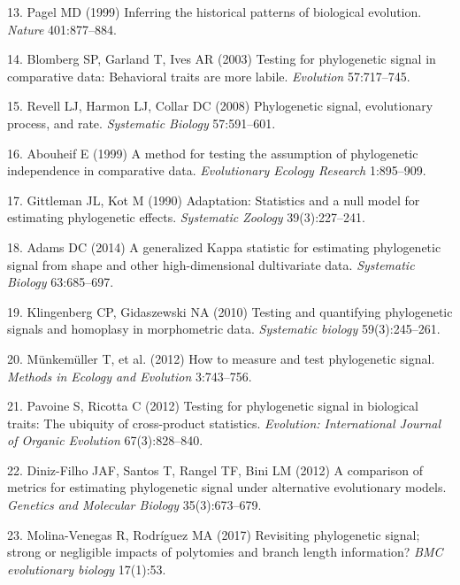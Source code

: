 \documentclass[9pt,twocolumn,twoside,lineno]{pnas-new}
\begin{document}
\leavevmode\hypertarget{ref-Pagel1999}{}%
13. Pagel MD (1999) Inferring the historical patterns of biological
evolution. \emph{Nature} 401:877--884.

\leavevmode\hypertarget{ref-Blomberg_et_al2003}{}%
14. Blomberg SP, Garland T, Ives AR (2003) Testing for phylogenetic
signal in comparative data: Behavioral traits are more labile.
\emph{Evolution} 57:717--745.

\leavevmode\hypertarget{ref-Revell_et_al2008}{}%
15. Revell LJ, Harmon LJ, Collar DC (2008) Phylogenetic signal,
evolutionary process, and rate. \emph{Systematic Biology} 57:591--601.

\leavevmode\hypertarget{ref-Abouheif1999}{}%
16. Abouheif E (1999) A method for testing the assumption of
phylogenetic independence in comparative data. \emph{Evolutionary
Ecology Research} 1:895--909.

\leavevmode\hypertarget{ref-Gittleman1990}{}%
17. Gittleman JL, Kot M (1990) Adaptation: Statistics and a null model
for estimating phylogenetic effects. \emph{Systematic Zoology}
39(3):227--241.

\leavevmode\hypertarget{ref-Adams2014a}{}%
18. Adams DC (2014) A generalized Kappa statistic for estimating
phylogenetic signal from shape and other high-dimensional dultivariate
data. \emph{Systematic Biology} 63:685--697.

\leavevmode\hypertarget{ref-Klingenberg2010}{}%
19. Klingenberg CP, Gidaszewski NA (2010) Testing and quantifying
phylogenetic signals and homoplasy in morphometric data.
\emph{Systematic biology} 59(3):245--261.

\leavevmode\hypertarget{ref-Munkemuller_et_al2012}{}%
20. Münkemüller T, et al. (2012) How to measure and test phylogenetic
signal. \emph{Methods in Ecology and Evolution} 3:743--756.

\leavevmode\hypertarget{ref-Pavoine2012}{}%
21. Pavoine S, Ricotta C (2012) Testing for phylogenetic signal in
biological traits: The ubiquity of cross-product statistics.
\emph{Evolution: International Journal of Organic Evolution}
67(3):828--840.

\leavevmode\hypertarget{ref-DinizFilho2012}{}%
22. Diniz-Filho JAF, Santos T, Rangel TF, Bini LM (2012) A comparison of
metrics for estimating phylogenetic signal under alternative
evolutionary models. \emph{Genetics and Molecular Biology}
35(3):673--679.

\leavevmode\hypertarget{ref-MolinaVenegas2017}{}%
23. Molina-Venegas R, Rodríguez MA (2017) Revisiting phylogenetic
signal; strong or negligible impacts of polytomies and branch length
information? \emph{BMC evolutionary biology} 17(1):53.
\end{document}
